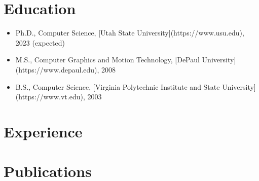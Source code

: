 \documentclass{moderncv}
\begin{document}
\section{Education}

\begin{itemize}
  \item Ph.D., Computer Science, [Utah State University](https://www.usu.edu), 2023 (expected)
  \item M.S., Computer Graphics and Motion Technology, [DePaul University](https://www.depaul.edu), 2008
  \item B.S., Computer Science, [Virginia Polytechnic Institute and State University](https://www.vt.edu), 2003
\end{itemize}

\section{Experience}


\section{Publications}

\end{document}
